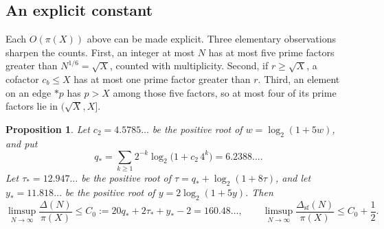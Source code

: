 \documentclass[11pt]{article}
\numberwithin{equation}{section}
\newtheorem{proposition}[theorem]{Proposition}
\theoremstyle{remark}
\begin{document}
\subsection*{An explicit constant}
Each $O(\pi(X))$ above can be made explicit. Three elementary observations sharpen the counts. First, an integer at most $N$ has at most five prime factors greater than $N^{1/6}=\sqrt X$, counted with multiplicity. Second, if $r\ge\sqrt X$, a cofactor $c_b\le X$ has at most one prime factor greater than $r$. Third, an element on an edge $*p$ has $p>X$ among those five factors, so at most four of its prime factors lie in $(\sqrt X,X]$.

\begin{proposition}\label{prop:explicit}
Let $c_2=4.5785\ldots$ be the positive root of $w=\log_2(1+5w)$, and put
\[
q_*=\sum_{k\ge1}2^{-k}\log_2\bigl(1+c_2\,4^k\bigr)=6.2388\ldots.
\]
Let $\tau_*=12.947\ldots$ be the positive root of $\tau=q_*+\log_2(1+8\tau)$, and let $y_*=11.818\ldots$ be the positive root of $y=2\log_2(1+5y)$. Then
\[
\limsup_{N\to\infty}\frac{\Delta(N)}{\pi(X)}\le C_0:=20q_*+2\tau_*+y_*-2=160.48\ldots,\qquad
\limsup_{N\to\infty}\frac{\Delta_{\mathrm{sf}}(N)}{\pi(X)}\le C_0+\frac12.
\]
\end{proposition}
\end{document}
